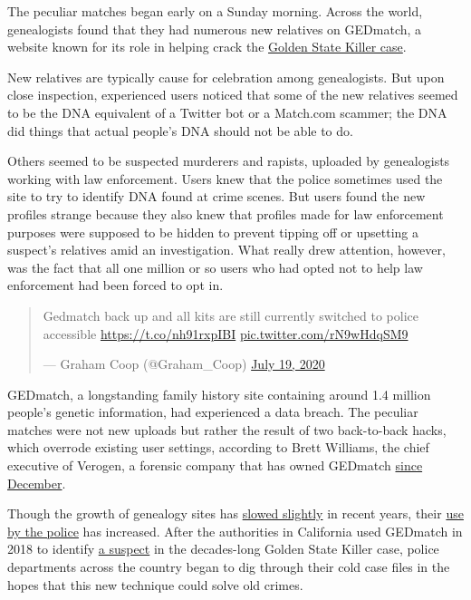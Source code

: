 The peculiar matches began early on a Sunday morning. Across the world,
genealogists found that they had numerous new relatives on GEDmatch, a
website known for its role in helping crack the
\href{https://www.nytimes3xbfgragh.onion/2020/06/29/us/golden-state-killer-joseph-deangelo.html}{Golden
State Killer case}.

New relatives are typically cause for celebration among genealogists.
But upon close inspection, experienced users noticed that some of the
new relatives seemed to be the DNA equivalent of a Twitter bot or a
Match.com scammer; the DNA did things that actual people's DNA should
not be able to do.

Others seemed to be suspected murderers and rapists, uploaded by
genealogists working with law enforcement. Users knew that the police
sometimes used the site to try to identify DNA found at crime scenes.
But users found the new profiles strange because they also knew that
profiles made for law enforcement purposes were supposed to be hidden to
prevent tipping off or upsetting a suspect's relatives amid an
investigation. What really drew attention, however, was the fact that
all one million or so users who had opted not to help law enforcement
had been forced to opt in.

\begin{quote}
Gedmatch back up and all kits are still currently switched to police
accessible \url{https://t.co/nh91rxpIBI}
\href{https://t.co/rN9wHdqSM9}{pic.twitter.com/rN9wHdqSM9}

--- Graham Coop (@Graham\_Coop)
\href{https://twitter.com/Graham_Coop/status/1284882121014702080?ref_src=twsrc\%5Etfw}{July
19, 2020}
\end{quote}

GEDmatch, a longstanding family history site containing around 1.4
million people's genetic information, had experienced a data breach. The
peculiar matches were not new uploads but rather the result of two
back-to-back hacks, which overrode existing user settings, according to
Brett Williams, the chief executive of Verogen, a forensic company that
has owned GEDmatch
\href{https://slate.com/technology/2019/12/gedmatch-verogen-genetic-genealogy-law-enforcement.html}{since
December}.

Though the growth of genealogy sites has
\href{https://www.cnbc.com/2020/01/23/23andme-lays-off-100-people-ceo-anne-wojcicki-explains-why.html}{slowed
slightly} in recent years, their
\href{https://www.nytimes3xbfgragh.onion/2019/04/25/us/golden-state-killer-dna.html}{use
by the police} has increased. After the authorities in California used
GEDmatch in 2018 to identify
\href{https://www.nytimes3xbfgragh.onion/2018/04/26/us/joseph-james-deangelo.html}{a
suspect} in the decades-long Golden State Killer case, police
departments across the country began to dig through their cold case
files in the hopes that this new technique could solve old crimes.

